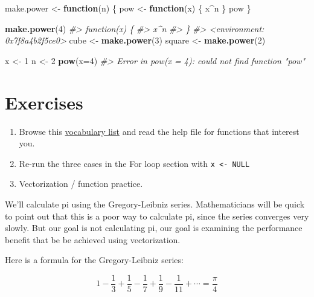 \documentclass[]{book}
\newenvironment{Shaded}{\begin{snugshade}}{\end{snugshade}}
\newcommand{\CommentTok}[1]{\textcolor[rgb]{0.56,0.35,0.01}{\textit{#1}}}
\newcommand{\ControlFlowTok}[1]{\textcolor[rgb]{0.13,0.29,0.53}{\textbf{#1}}}
\newcommand{\DataTypeTok}[1]{\textcolor[rgb]{0.13,0.29,0.53}{#1}}
\newcommand{\DecValTok}[1]{\textcolor[rgb]{0.00,0.00,0.81}{#1}}
\newcommand{\KeywordTok}[1]{\textcolor[rgb]{0.13,0.29,0.53}{\textbf{#1}}}
\newcommand{\NormalTok}[1]{#1}
\newcommand{\OperatorTok}[1]{\textcolor[rgb]{0.81,0.36,0.00}{\textbf{#1}}}
\newcommand{\StringTok}[1]{\textcolor[rgb]{0.31,0.60,0.02}{#1}}
\providecommand{\tightlist}{%
  \setlength{\itemsep}{0pt}\setlength{\parskip}{0pt}}
\theoremstyle{definition}
\theoremstyle{definition}
\theoremstyle{definition}
\theoremstyle{remark}
\begin{document}
\begin{Shaded}
\begin{Highlighting}[]
\NormalTok{make.power <-}\StringTok{ }\ControlFlowTok{function}\NormalTok{(n) \{}
\NormalTok{  pow <-}\StringTok{ }\ControlFlowTok{function}\NormalTok{(x) \{}
\NormalTok{    x}\OperatorTok{^}\NormalTok{n }
\NormalTok{  \}}
\NormalTok{  pow}
\NormalTok{\}}

\KeywordTok{make.power}\NormalTok{(}\DecValTok{4}\NormalTok{)}
\CommentTok{#> function(x) \{}
\CommentTok{#>     x^n }
\CommentTok{#>   \}}
\CommentTok{#> <environment: 0x7f8a4b2f5ce0>}
\NormalTok{cube <-}\StringTok{ }\KeywordTok{make.power}\NormalTok{(}\DecValTok{3}\NormalTok{)}
\NormalTok{square <-}\StringTok{ }\KeywordTok{make.power}\NormalTok{(}\DecValTok{2}\NormalTok{)}

\NormalTok{x <-}\StringTok{ }\DecValTok{1}
\NormalTok{n <-}\StringTok{ }\DecValTok{2}
\KeywordTok{pow}\NormalTok{(}\DataTypeTok{x=}\DecValTok{4}\NormalTok{)}
\CommentTok{#> Error in pow(x = 4): could not find function "pow"}
\end{Highlighting}
\end{Shaded}

\hypertarget{exercises-1}{%
\section{Exercises}\label{exercises-1}}

\begin{enumerate}
\def\labelenumi{\arabic{enumi}.}
\tightlist
\item
  Browse this \href{http://adv-r.had.co.nz/Vocabulary.html}{vocabulary
  list} and read the help file for functions that interest you.
\item
  Re-run the three cases in the For loop section with
  \texttt{x\ \textless{}-\ NULL}
\item
  Vectorization / function practice.
\end{enumerate}

We'll calculate pi using the Gregory-Leibniz series. Mathematicians will
be quick to point out that this is a poor way to calculate pi, since the
series converges very slowly. But our goal is not calculating pi, our
goal is examining the performance benefit that be be achieved using
vectorization.

Here is a formula for the Gregory-Leibniz series:

\begin{equation}
1 - \frac{1}{3} + \frac{1}{5} - \frac{1}{7} + \frac{1}{9} - \frac{1}{11} + \cdots = \frac{\pi}{4}
\end{equation}
\end{document}
